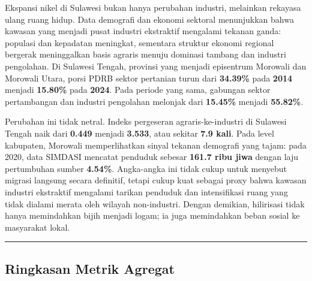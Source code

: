 \documentclass[
]{article}
\begin{document}
Ekspansi nikel di Sulawesi bukan hanya perubahan industri, melainkan
rekayasa ulang ruang hidup. Data demografi dan ekonomi sektoral
menunjukkan bahwa kawasan yang menjadi pusat industri ekstraktif
mengalami tekanan ganda: populasi dan kepadatan meningkat, sementara
struktur ekonomi regional bergerak meninggalkan basis agraris menuju
dominasi tambang dan industri pengolahan. Di Sulawesi Tengah, provinsi
yang menjadi episentrum Morowali dan Morowali Utara, porsi PDRB sektor
pertanian turun dari \textbf{34.39\%} pada \textbf{2014} menjadi
\textbf{15.80\%} pada \textbf{2024}. Pada periode yang sama, gabungan
sektor pertambangan dan industri pengolahan melonjak dari
\textbf{15.45\%} menjadi \textbf{55.82\%}.

Perubahan ini tidak netral. Indeks pergeseran agraris-ke-industri di
Sulawesi Tengah naik dari \textbf{0.449} menjadi \textbf{3.533}, atau
sekitar \textbf{7.9 kali}. Pada level kabupaten, Morowali memperlihatkan
sinyal tekanan demografi yang tajam: pada 2020, data SIMDASI mencatat
penduduk sebesar \textbf{161.7 ribu jiwa} dengan laju pertumbuhan sumber
\textbf{4.54\%}. Angka-angka ini tidak cukup untuk menyebut migrasi
langsung secara definitif, tetapi cukup kuat sebagai proxy bahwa kawasan
industri ekstraktif mengalami tarikan penduduk dan intensifikasi ruang
yang tidak dialami merata oleh wilayah non-industri. Dengan demikian,
hilirisasi tidak hanya memindahkan bijih menjadi logam; ia juga
memindahkan beban sosial ke masyarakat lokal.

\begin{center}\rule{0.5\linewidth}{0.5pt}\end{center}

\subsection{Ringkasan Metrik Agregat}\label{ringkasan-metrik-agregat}
\end{document}
